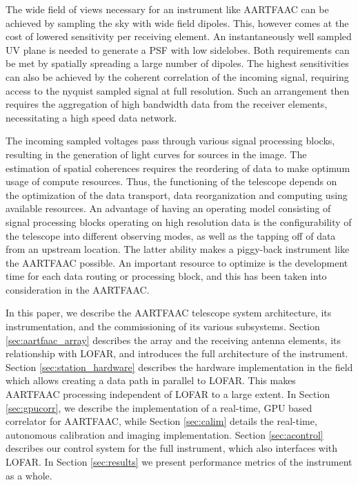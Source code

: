 \documentclass{ws-jai}
\begin{document}
The  wide field  of  views necessary  for  an instrument  like  AARTFAAC can  be
achieved by sampling the sky with wide field dipoles. This, however comes at the
cost  of lowered  sensitivity per  receiving element.   An instantaneously  well
sampled  UV  plane  is  needed  to  generate a  PSF  with  low  sidelobes.  Both
requirements can be  met by spatially spreading a large  number of dipoles.  The
highest sensitivities  can also be achieved  by the coherent correlation  of the
incoming  signal,  requiring  access  to  the nyquist  sampled  signal  at  full
resolution. Such an arrangement then  requires the aggregation of high bandwidth
data from the receiver elements, necessitating a high speed data network.

The incoming  sampled voltages  pass through  various signal  processing blocks,
resulting  in the  generation of  light curves  for sources  in the  image.  The
estimation of spatial coherences requires the reordering of data to make optimum
usage of  compute resources. Thus, the  functioning of the telescope  depends on
the optimization of the data  transport, data reorganization and computing using
available resources.   An advantage of  having an operating model  consisting of
signal   processing  blocks   operating   on  high   resolution   data  is   the
configurability of the telescope into different  observing modes, as well as the
tapping  off of  data from  an upstream  location.  The  latter ability  makes a
piggy-back  instrument like  the  AARTFAAC possible.  An  important resource  to
optimize is the development time for  each data routing or processing block, and
this has been taken into consideration in the AARTFAAC.

In  this paper,  we describe  the  AARTFAAC telescope  system architecture,  its
instrumentation,  and  the commissioning  of  its  various subsystems.   Section
\ref{sec:aartfaac_array} describes the array and the receiving antenna elements,
its  relationship  with LOFAR,  and  introduces  the  full architecture  of  the
instrument.    Section   \ref{sec:station_hardware}   describes   the   hardware
implementation in  the field which  allows creating a  data path in  parallel to
LOFAR. This  makes AARTFAAC processing independent  of LOFAR to a  large extent.
In Section \ref{sec:gpucorr}, we describe the implementation of a real-time, GPU
based  correlator  for  AARTFAAC,  while  Section  \ref{sec:calim}  details  the
real-time,   autonomous  calibration   and   imaging  implementation.    Section
\ref{sec:acontrol} describes our  control system for the  full instrument, which
also interfaces with LOFAR.  In Section \ref{sec:results} we present performance
metrics of the instrument as a whole.
\end{document}
